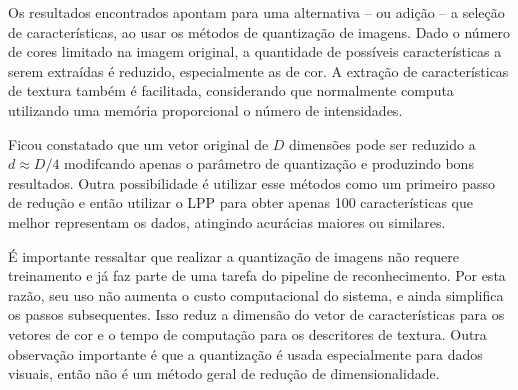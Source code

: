 
%
%
%
%
%
%



Os resultados encontrados apontam para uma alternativa -- ou adição -- a seleção de características, ao usar os métodos de quantização de imagens. Dado o número de cores limitado na imagem original, a quantidade de possíveis características a serem extraídas é reduzido, especialmente as de cor. A extração de características de textura também é facilitada, considerando que normalmente computa utilizando uma memória proporcional o número de intensidades.

Ficou constatado que um vetor original de $D$ dimensões pode ser reduzido a $d \approx D/4$ modifcando apenas o parâmetro de quantização e produzindo bons resultados. Outra possibilidade é utilizar esse métodos como um primeiro passo de redução e então utilizar o LPP para obter apenas 100 características que melhor representam os dados, atingindo acurácias maiores ou similares.

É importante ressaltar que realizar a quantização de imagens não requere treinamento e já faz parte de uma tarefa do pipeline de reconhecimento. Por esta razão, seu uso não aumenta o custo computacional do sistema, e ainda simplifica os passos subsequentes. Isso reduz a dimensão do vetor de características para os vetores de cor e o tempo de computação para os descritores de textura. Outra observação importante é que a quantização é usada especialmente para dados visuais, então não é um método geral de redução de dimensionalidade.

